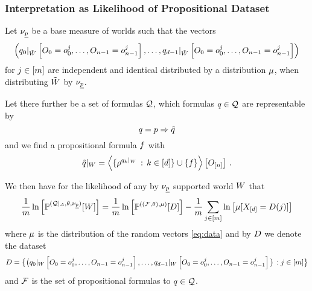 \subsubsection{Interpretation as Likelihood of Propositional Dataset}


\begin{theorem}\label{the:FOLworldToPLdataset}
	Let $\nu_{\underline{p}}$ be a base measure of worlds such that the vectors
	\begin{align} \label{eq:data}
		\left(  {q_{0}}|_{\tilde{W}} \left[O_{0}=o_{0}^j,\ldots,O_{n-1}=o_{n-1}^j\right], \ldots,
			{q_{d-1}}|_{\tilde{W}} \left[O_{0}=o_{0}^j,\ldots,O_{n-1}=o_{n-1}^j\right]
		\right) 
	\end{align}
	for $j\in[m]$ are independent and identical distributed by a distribution $\mu$, when distributing $\tilde{W}$ by $\nu_{\underline{p}}$.

	Let there further be a set of formulas $\mathcal{Q}$, which formulas $q\in\mathcal{Q}$ are representable by 
		\[ q = p \Rightarrow \tilde{q} \]
	and we find a propositional formula $f$ with
		\[ {\tilde{q}}|_{W} = \left\langle \{\rho^{{q_{k}}|_{W}} \, : \, k\in[d] \} \cup \{f \}\right\rangle \left[ O_{[n]} \right] \, . \]
		
		
	We then have for the likelihood of any by $\nu_{\underline{p}}$ supported world $W$ that
		\[ 	\frac{1}{m} \ln \left[ \mathbb{P}^{(\mathcal{Q} |_{A},\theta , \nu_{\underline{p}})} [W] \right] = 	\frac{1}{m} \ln \left[ \mathbb{P}^{((\mathcal{F},\theta),\mu)} [D] \right] - \frac{1}{m} \sum_{j\in[m]} \ln \left[ \mu[X_{[d]} = D({j})] \right] \]
	where $\mu$ is the distribution of the random vectors \eqref{eq:data} and by $D$ we denote the dataset
	\begin{align*}
		D = \big\{\big( {q_{0}}|_{W} \left[O_{0}=o_{0}^j,\ldots,O_{n-1}=o_{n-1}^j\right], \ldots ,
				 {q_{d-1}}|_{W} \left[O_{0}=o_{0}^j,\ldots,O_{n-1}=o_{n-1}^j\right] \big) \, : j\in[m] \big\}
	\end{align*}
	and $\mathcal{F}$ is the set of propositional formulas to $q\in\mathcal{Q}$.
\end{theorem}


